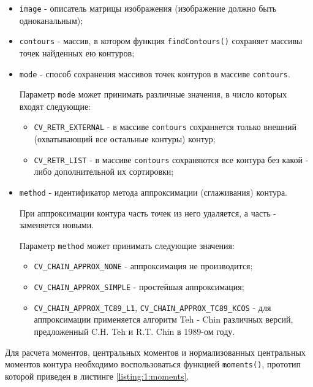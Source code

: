 \begin{itemize}

	\item \verb|image| - описатель матрицы изображения (изображение должно быть одноканальным);
	\item \verb|contours| - массив, в котором функция \verb|findContours()| сохраняет массивы точек найденных ею контуров;
	\item \verb|mode| - способ сохранения массивов точек контуров в массиве \verb|contours|.

	Параметр \verb|mode| может принимать различные значения, в число которых входят следующие:

	\begin{itemize}

		\item \verb|CV_RETR_EXTERNAL| - в массиве \verb|contours| сохраняется только внешний (охватывающий все остальные контуры) контур;
		\item \verb|CV_RETR_LIST| - в массиве \verb|contours| сохраняются все контура без какой - либо дополнительной их сортировки;

	\end{itemize}

	\item \verb|method| - идентификатор метода аппроксимации (сглаживания) контура.

	При аппроксимации контура часть точек из него удаляется, а часть - заменяется новыми.

	Параметр \verb|method| может принимать следующие значения:

	\begin{itemize}

		\item \verb|CV_CHAIN_APPROX_NONE| - аппроксимация не производится;
		\item \verb|CV_CHAIN_APPROX_SIMPLE| - простейшая аппроксимация;
		\item \verb|CV_CHAIN_APPROX_TC89_L1|, \verb|CV_CHAIN_APPROX_TC89_KCOS| - для аппроксимации применяется алгоритм Teh - Chin различных версий, предложенный C.H. Teh и R.T. Chin в 1989-ом году.

	\end{itemize}

\end{itemize}

Для расчета моментов, центральных моментов и нормализованных центральных моментов контура необходимо воспользоваться функцией \verb|moments()|, прототип которой приведен в листинге \ref{listing:1:moments}.

